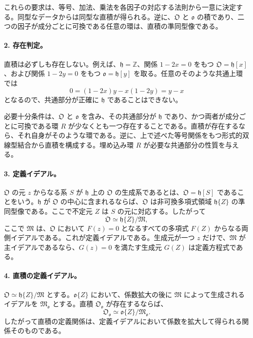 これらの要求は、等号、加法、乗法を各因子の対応する法則から一意に決定する。同型なデータからは同型な直積が得られる。逆に、\(\mathfrak O\) と \(\mathfrak o\) の積であり、二つの因子が成分ごとに可換である任意の環は、直積の準同型像である。

\paragraph{2. 存在判定。}
直積は必ずしも存在しない。例えば、\(\mathfrak h=\mathbb Z\)、関係 \(1-2x=0\) をもつ \(\mathfrak O=\mathfrak h[x]\)、および関係 \(1-2y=0\) をもつ \(\mathfrak o=\mathfrak h[y]\) を取る。任意のそのような共通上環では
\[
        0=(1-2x)y-x(1-2y)=y-x
\]
となるので、共通部分が正確に \(\mathfrak h\) であることはできない。

必要十分条件は、\(\mathfrak O\) と \(\mathfrak o\) を含み、その共通部分が \(\mathfrak h\) であり、かつ両者が成分ごとに可換である環 \(R\) が少なくとも一つ存在することである。直積が存在するなら、それ自身がそのような環である。逆に、上で述べた等号関係をもつ形式的双線型結合から直積を構成する。埋め込み環 \(R\) が必要な共通部分の性質を与える。

\paragraph{3. 定義イデアル。}
\(\mathfrak O\) の元 \(z\) からなる系 \(S\) が \(\mathfrak h\) 上の \(\mathfrak O\) の生成系であるとは、\(\mathfrak O=\mathfrak h[S]\) であることをいう。\(\mathfrak h\) が \(\mathfrak O\) の中心に含まれるならば、\(\mathfrak O\) は非可換多項式領域 \(\mathfrak h\{Z\}\) の準同型像である。ここで不定元 \(Z\) は \(S\) の元に対応する。したがって
\[
        \mathfrak O\simeq \mathfrak h\{Z\}/\mathfrak M,
\]
ここで \(\mathfrak M\) は、\(\mathfrak O\) において \(F(z)=0\) となるすべての多項式 \(F(Z)\) からなる両側イデアルである。これが定義イデアルである。生成元が一つ \(z\) だけで、\(\mathfrak M\) が主イデアルであるなら、\(G(z)=0\) を満たす生成元 \(G(Z)\) は定義方程式である。

\paragraph{4. 直積の定義イデアル。}
\(\mathfrak O\simeq\mathfrak h\{Z\}/\mathfrak M\) とする。\(\mathfrak o\{Z\}\) において、係数拡大の後に \(\mathfrak M\) によって生成されるイデアルを \(\mathfrak M_{\mathfrak o}\) とする。直積 \(\mathfrak O_{\mathfrak o}\) が存在するならば、
\[
        \mathfrak O_{\mathfrak o}\simeq \mathfrak o\{Z\}/\mathfrak M_{\mathfrak o}.
\]
したがって直積の定義関係は、定義イデアルにおいて係数を拡大して得られる関係そのものである。

